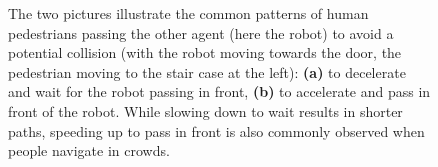 \documentclass[conference]{IEEEtran}
\begin{document}
\begin{figure}[t]
  \begin{center}
  \hspace*{-1em}
  \hspace*{-0.03em}
  \end{center}
  \vspace{-0.85em}
  \caption{The two pictures illustrate the common patterns of human 
    pedestrians passing the other agent (here the robot) to avoid a potential 
    collision (with the robot 
    moving towards the door, the pedestrian moving to the stair case at the left): {\bf (a)} to 
    decelerate and wait for the robot passing in front, 
    {\bf (b)} to accelerate and pass in front of the robot. %
    While 
    slowing down to wait results in shorter paths, speeding up to pass in 
    front is also commonly observed when people navigate in crowds. 
    }  
  \vspace{-1em}
\label{fig1}
\end{figure}


\end{document}
